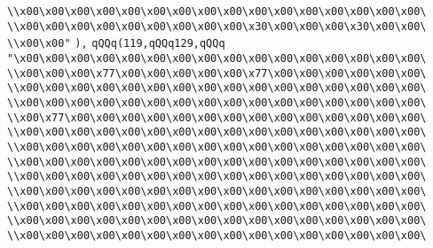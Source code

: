 \verb|\\x00\x00\x00\x00\x00\x00\x00\x00\x00\x00\x00\x00\x00\x00\x00\x00\|\newline
\verb|\\x00\x00\x00\x00\x00\x00\x00\x00\x00\x30\x00\x00\x00\x30\x00\x00\|\newline
\verb|\\x00\x00"|\newline
\verb|),|\newline
\verb|qQQq(119,qQQq129,qQQq|\newline
\verb|"\x00\x00\x00\x00\x00\x00\x00\x00\x00\x00\x00\x00\x00\x00\x00\x00\|\newline
\verb|\\x00\x00\x00\x77\x00\x00\x00\x00\x00\x77\x00\x00\x00\x00\x00\x00\|\newline
\verb|\\x00\x00\x00\x00\x00\x00\x00\x00\x00\x00\x00\x00\x00\x00\x00\x00\|\newline
\verb|\\x00\x00\x00\x00\x00\x00\x00\x00\x00\x00\x00\x00\x00\x00\x00\x00\|\newline
\verb|\\x00\x77\x00\x00\x00\x00\x00\x00\x00\x00\x00\x00\x00\x00\x00\x00\|\newline
\verb|\\x00\x00\x00\x00\x00\x00\x00\x00\x00\x00\x00\x00\x00\x00\x00\x00\|\newline
\verb|\\x00\x00\x00\x00\x00\x00\x00\x00\x00\x00\x00\x00\x00\x00\x00\x00\|\newline
\verb|\\x00\x00\x00\x00\x00\x00\x00\x00\x00\x00\x00\x00\x00\x00\x00\x00\|\newline
\verb|\\x00\x00\x00\x00\x00\x00\x00\x00\x00\x00\x00\x00\x00\x00\x00\x00\|\newline
\verb|\\x00\x00\x00\x00\x00\x00\x00\x00\x00\x00\x00\x00\x00\x00\x00\x00\|\newline
\verb|\\x00\x00\x00\x00\x00\x00\x00\x00\x00\x00\x00\x00\x00\x00\x00\x00\|\newline
\verb|\\x00\x00\x00\x00\x00\x00\x00\x00\x00\x00\x00\x00\x00\x00\x00\x00\|\newline
\verb|\\x00\x00\x00\x00\x00\x00\x00\x00\x00\x00\x00\x00\x00\x00\x00\x00\|\newline
